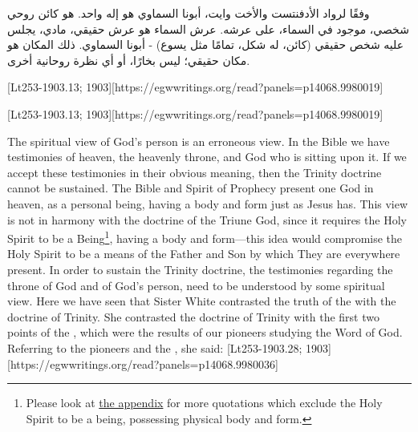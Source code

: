 {وفقًا لرواد الأدفنتست والأخت وايت، أبونا السماوي هو إله واحد. هو كائن روحي شخصي، موجود في السماء، على عرشه. عرش السماء هو عرش حقيقي، مادي، يجلس عليه شخص حقيقي (كائن، له شكل، تمامًا مثل يسوع) - أبونا السماوي. ذلك المكان هو مكان حقيقي؛ ليس بخارًا، أو أي نظرة روحانية أخرى.


[Lt253-1903.13; 1903][https://egwwritings.org/read?panels=p14068.9980019]


[Lt253-1903.13; 1903][https://egwwritings.org/read?panels=p14068.9980019]


The spiritual view of God’s person is an erroneous view. In the Bible we have testimonies of heaven, the heavenly throne, and God who is sitting upon it. If we accept these testimonies in their obvious meaning, then the Trinity doctrine cannot be sustained. The Bible and Spirit of Prophecy present one God in heaven, as a personal being, having a body and form just as Jesus has. This view is not in harmony with the doctrine of the Triune God, since it requires the Holy Spirit to be a Being\footnote{Please look at \hyperref[appendix:unauthenticated-reports]{the appendix} for more quotations which exclude the Holy Spirit to be a being, possessing physical body and form.}, having a body and form—this idea would compromise the Holy Spirit to be a means of the Father and Son by which They are everywhere present. In order to sustain the Trinity doctrine, the testimonies regarding the throne of God and of God’s person, need to be understood by some spiritual view. Here we have seen that Sister White contrasted the truth of the  with the doctrine of Trinity. She contrasted the doctrine of Trinity with the first two points of the , which were the results of our pioneers studying the Word of God. Referring to the pioneers and the , she said: [Lt253-1903.28; 1903][https://egwwritings.org/read?panels=p14068.9980036]


}
